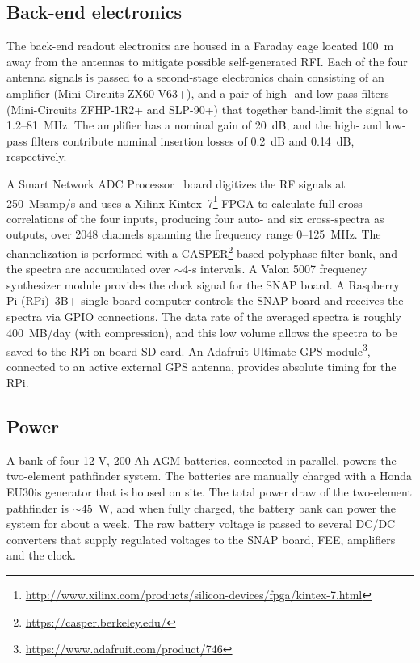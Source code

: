 \documentclass{ws-jai}
\begin{document}
\subsection{Back-end electronics}

The back-end readout electronics are housed in a Faraday cage located
100~m away from the antennas to mitigate possible self-generated RFI.
Each of the four antenna signals is passed to a second-stage
electronics chain consisting of an amplifier (Mini-Circuits ZX60-V63+),
and a pair of high- and low-pass filters (Mini-Circuits ZFHP-1R2+ and
SLP-90+) that together band-limit the signal to 1.2--\SI{81}{MHz}.
The amplifier has a nominal gain of 20~dB, and the high- and low-pass
filters contribute nominal insertion losses of 0.2~dB and 0.14~dB,
respectively.

A Smart Network ADC Processor~\citep[SNAP;][]{2016JAI.....541001H}
board digitizes the RF signals at 250~Msamp/s and uses a Xilinx
Kintex~7\footnote{\url{http://www.xilinx.com/products/silicon-devices/fpga/kintex-7.html}}
FPGA to calculate full cross-correlations of the four inputs,
producing four auto- and six cross-spectra as outputs, over 2048
channels spanning the frequency range 0--125~MHz.  The channelization
is performed with a
CASPER\footnote{\url{https://casper.berkeley.edu/}}-based polyphase
filter bank, and the spectra are accumulated over $\sim4$-s intervals.
A Valon 5007 frequency synthesizer module provides the clock signal
for the SNAP board.  A Raspberry Pi (RPi)~3B+ single board computer
controls the SNAP board and receives the spectra via GPIO connections.
The data rate of the averaged spectra is roughly 400~MB/day (with
compression), and this low volume allows the spectra to be saved to
the RPi on-board SD card.  An Adafruit Ultimate GPS
module\footnote{\url{https://www.adafruit.com/product/746}}, connected
to an active external GPS antenna, provides absolute timing for the
RPi.

\subsection{Power}

A bank of four 12-V, 200-Ah AGM batteries, connected in parallel,
powers the two-element pathfinder system.  The batteries are manually
charged with a Honda EU30is generator that is housed on site.  The
total power draw of the two-element pathfinder is $\sim45$~W, and when
fully charged, the battery bank can power the system for about a week.
The raw battery voltage is passed to several DC/DC converters that
supply regulated voltages to the SNAP board, FEE, amplifiers and the
clock.
\end{document}
